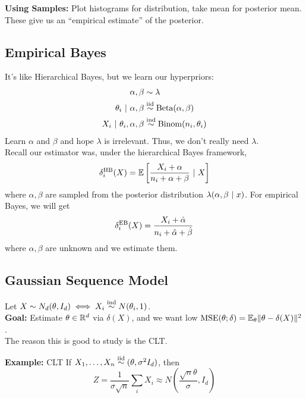 \textbf{Using Samples:} Plot histograms for distribution, take mean for posterior mean. These give us an ``empirical estimate'' of the posterior.

\subsection*{Empirical Bayes}
\sectionspace

It's like Hierarchical Bayes, but we learn our hyperpriors:
\begin{align*}
    \alpha, \beta &\sim \lambda\\
    \theta_i \given \alpha, \beta &\iidsim \tt{Beta}(\alpha, \beta)\\
    X_i \given \theta_i, \alpha, \beta &\overset{\tt{ind}}{\sim} \Binom(n_i, \theta_i)
\end{align*}
Learn $\alpha$ and $\beta$ and hope $\lambda$ is irrelevant. Thus, we don't really need $\lambda$.\\

Recall our estimator was, under the hierarchical Bayes framework,
\[ \delta_i^{\tt{HB}}(X) = \E\left[\frac{X_i + \alpha}{n_i + \alpha + \beta} \given X\right] \]
where $\alpha, \beta$ are sampled from the posterior distribution $\lambda(\alpha, \beta \given x)$. For empirical Bayes, we will get
\[ \delta_i^{\tt{EB}}(X) = \frac{X_i + \hat{\alpha}}{n_i + \hat{\alpha} + \hat{\beta}} \]
where $\alpha, \beta$ are unknown and we estimate them.

\subsection*{Gaussian Sequence Model}
\sectionspace


Let $X \sim N_d(\theta, I_d) \iff X_i \overset{\tt{ind}}{\sim} N(\theta_i, 1)$.\\

\textbf{Goal:} Estimate $\theta \in \R^d$ via $\delta(X)$, and we want low $\tt{MSE}(\theta; \delta) = \E_{\theta}\norm{\theta - \delta(X)}^2$.\\

The reason this is good to study is the CLT.

\begin{example}{\textbf{Example:} CLT}
    If $X_1, \ldots, X_n \iidsim (\theta, \sigma^2 I_d)$, then
    \[ Z = \frac{1}{\sigma\sqrt{n}}\sum_{i} X_i \approx N\left(\frac{\sqrt{n}\theta}{\sigma}, I_d\right) \]
\end{example}

